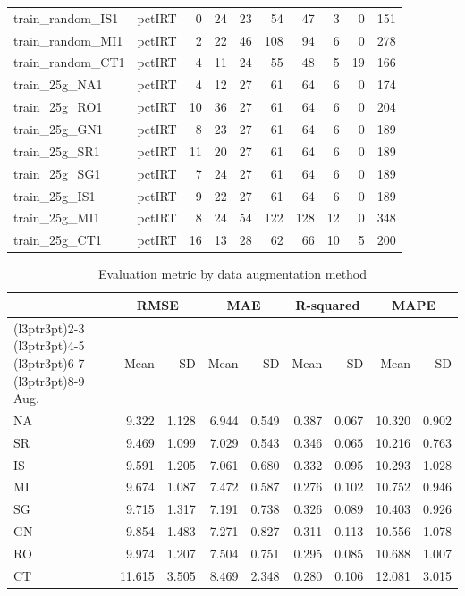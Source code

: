\documentclass[sn-basic,pdflatex]{sn-jnl}
\theoremstyle{remark}
\theoremstyle{definition}
\begin{document}
\begin{table}[!h]
\begin{tabular}[t]{llrrrrrrrr}
train\_random\_IS1 & pctIRT & 0 & 24 & 23 & 54 & 47 & 3 & 0 & 151\\
train\_random\_MI1 & pctIRT & 2 & 22 & 46 & 108 & 94 & 6 & 0 & 278\\
train\_random\_CT1 & pctIRT & 4 & 11 & 24 & 55 & 48 & 5 & 19 & 166\\
train\_25g\_NA1 & pctIRT & 4 & 12 & 27 & 61 & 64 & 6 & 0 & 174\\
\addlinespace
train\_25g\_RO1 & pctIRT & 10 & 36 & 27 & 61 & 64 & 6 & 0 & 204\\
train\_25g\_GN1 & pctIRT & 8 & 23 & 27 & 61 & 64 & 6 & 0 & 189\\
train\_25g\_SR1 & pctIRT & 11 & 20 & 27 & 61 & 64 & 6 & 0 & 189\\
train\_25g\_SG1 & pctIRT & 7 & 24 & 27 & 61 & 64 & 6 & 0 & 189\\
train\_25g\_IS1 & pctIRT & 9 & 22 & 27 & 61 & 64 & 6 & 0 & 189\\
\addlinespace
train\_25g\_MI1 & pctIRT & 8 & 24 & 54 & 122 & 128 & 12 & 0 & 348\\
train\_25g\_CT1 & pctIRT & 16 & 13 & 28 & 62 & 66 & 10 & 5 & 200\\
\bottomrule
\end{tabular}
\end{table}

\begin{table}

\caption{\label{tab:table_aug_performance}Evaluation metric by data augmentation method}
\centering
\begin{tabular}[t]{lrrrrrrrr}
\toprule
\multicolumn{1}{c}{ } & \multicolumn{2}{c}{RMSE} & \multicolumn{2}{c}{MAE} & \multicolumn{2}{c}{R-squared} & \multicolumn{2}{c}{MAPE} \\
\cmidrule(l{3pt}r{3pt}){2-3} \cmidrule(l{3pt}r{3pt}){4-5} \cmidrule(l{3pt}r{3pt}){6-7} \cmidrule(l{3pt}r{3pt}){8-9}
Aug. & Mean & SD & Mean & SD & Mean & SD & Mean & SD\\
\midrule
NA & 9.322 & 1.128 & 6.944 & 0.549 & 0.387 & 0.067 & 10.320 & 0.902\\
SR & 9.469 & 1.099 & 7.029 & 0.543 & 0.346 & 0.065 & 10.216 & 0.763\\
IS & 9.591 & 1.205 & 7.061 & 0.680 & 0.332 & 0.095 & 10.293 & 1.028\\
MI & 9.674 & 1.087 & 7.472 & 0.587 & 0.276 & 0.102 & 10.752 & 0.946\\
SG & 9.715 & 1.317 & 7.191 & 0.738 & 0.326 & 0.089 & 10.403 & 0.926\\
\addlinespace
GN & 9.854 & 1.483 & 7.271 & 0.827 & 0.311 & 0.113 & 10.556 & 1.078\\
RO & 9.974 & 1.207 & 7.504 & 0.751 & 0.295 & 0.085 & 10.688 & 1.007\\
CT & 11.615 & 3.505 & 8.469 & 2.348 & 0.280 & 0.106 & 12.081 & 3.015\\
\bottomrule
\end{tabular}
\end{table}
\end{document}
